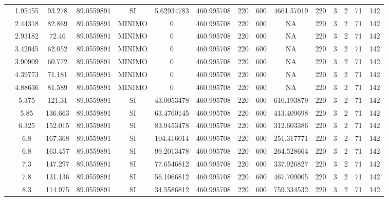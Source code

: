 \begin{table}[H]
{\begin{tabular}{|c|c|c|c|c|c|c|c|c|c|c|c|c|c|c|}
\cline{2-15}    & 1.95455 & 93.278 & 89.0559891 & SI  & 5.62934783 & 460.995708 & 220 & 600 & 4661.57019 & 220 & 3   & 2   & 71  & 142 \bigstrut\\
\cline{2-15}    & 2.44318 & 82.869 & 89.0559891 & MINIMO & 0   & 460.995708 & 220 & 600 & NA  & 220 & 3   & 2   & 71  & 142 \bigstrut\\
\cline{2-15}    & 2.93182 & 72.46 & 89.0559891 & MINIMO & 0   & 460.995708 & 220 & 600 & NA  & 220 & 3   & 2   & 71  & 142 \bigstrut\\
\cline{2-15}    & 3.42045 & 62.052 & 89.0559891 & MINIMO & 0   & 460.995708 & 220 & 600 & NA  & 220 & 3   & 2   & 71  & 142 \bigstrut\\
\cline{2-15}    & 3.90909 & 60.772 & 89.0559891 & MINIMO & 0   & 460.995708 & 220 & 600 & NA  & 220 & 3   & 2   & 71  & 142 \bigstrut\\
\cline{2-15}    & 4.39773 & 71.181 & 89.0559891 & MINIMO & 0   & 460.995708 & 220 & 600 & NA  & 220 & 3   & 2   & 71  & 142 \bigstrut\\
\cline{2-15}    & 4.88636 & 81.589 & 89.0559891 & MINIMO & 0   & 460.995708 & 220 & 600 & NA  & 220 & 3   & 2   & 71  & 142 \bigstrut\\
\cline{2-15}    & 5.375 & 121.31 & 89.0559891 & SI  & 43.0053478 & 460.995708 & 220 & 600 & 610.193879 & 220 & 3   & 2   & 71  & 142 \bigstrut\\
\cline{2-15}    & 5.85 & 136.663 & 89.0559891 & SI  & 63.4760145 & 460.995708 & 220 & 600 & 413.409698 & 220 & 3   & 2   & 71  & 142 \bigstrut\\
\cline{2-15}    & 6.325 & 152.015 & 89.0559891 & SI  & 83.9453478 & 460.995708 & 220 & 600 & 312.603386 & 220 & 3   & 2   & 71  & 142 \bigstrut\\
\cline{2-15}    & 6.8 & 167.368 & 89.0559891 & SI  & 104.416014 & 460.995708 & 220 & 600 & 251.317771 & 220 & 3   & 2   & 71  & 142 \bigstrut\\
\cline{2-15}    & 6.8 & 163.457 & 89.0559891 & SI  & 99.2013478 & 460.995708 & 220 & 600 & 264.528664 & 220 & 3   & 2   & 71  & 142 \bigstrut\\
\cline{2-15}    & 7.3 & 147.297 & 89.0559891 & SI  & 77.6546812 & 460.995708 & 220 & 600 & 337.926827 & 220 & 3   & 2   & 71  & 142 \bigstrut\\
\cline{2-15}    & 7.8 & 131.136 & 89.0559891 & SI  & 56.1066812 & 460.995708 & 220 & 600 & 467.709005 & 220 & 3   & 2   & 71  & 142 \bigstrut\\
\cline{2-15}    & 8.3 & 114.975 & 89.0559891 & SI  & 34.5586812 & 460.995708 & 220 & 600 & 759.334532 & 220 & 3   & 2   & 71  & 142 \bigstrut\\

\end{tabular}}
\end{table}
